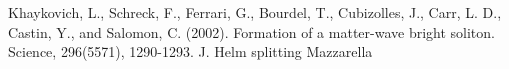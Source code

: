 \documentclass[pra,twocolumn]{revtex4-2}
\begin{document}

\begin{thebibliography}{99} %

Khaykovich, L., Schreck, F., Ferrari, G., Bourdel, T., Cubizolles, J., Carr, L. D., Castin, Y., and Salomon, C. (2002). Formation of a matter-wave bright soliton. Science, 296(5571), 1290-1293.
J. Helm splitting
Mazzarella

\end{thebibliography}
\end{document}
